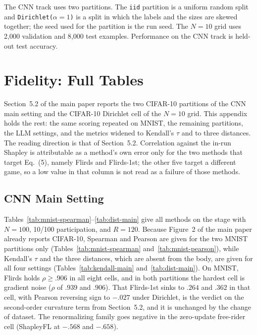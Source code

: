 \documentclass[letterpaper]{article} %
\theoremstyle{plain}
\begin{document}
The CNN track uses two partitions. The \texttt{iid} partition is a uniform
random split and \texttt{Dirichlet($\alpha{=}1$)} is a split in which the
labels and the sizes are skewed together; the seed used for the partition is
the run seed. The $N{=}10$ grid uses 2{,}000 validation and 8{,}000 test
examples. Performance on the CNN track is held-out test accuracy.

\section{Fidelity: Full Tables}
\label{app:fidelity}

Section~5.2 of the main paper reports the two CIFAR-10 partitions of the CNN
main setting and the CIFAR-10 Dirichlet cell of the $N{=}10$ grid. This
appendix holds the rest: the same scoring repeated on MNIST, the remaining
partitions, the LLM settings, and the metrics widened to Kendall's $\tau$ and
to three distances. The reading direction is that of Section~5.2. Correlation
against the in-run Shapley is attributable as a method's own error only for
the two methods that target Eq.~(5), namely Flirds and Flirds-1st; the other
five target a different game, so a low value in that column is not read as a
failure of those methods.

\subsection{CNN Main Setting}
\label{app:cnn-main}

Tables~\ref{tab:mnist-spearman}--\ref{tab:dist-main} give all methods on the
stage with $N{=}100$, 10/100 participation, and $R{=}120$. Because Figure~2
of the main paper already reports CIFAR-10, Spearman and Pearson are given
for the two MNIST partitions only (Tables~\ref{tab:mnist-spearman}
and~\ref{tab:mnist-pearson}), while Kendall's $\tau$ and the three distances,
which are absent from the body, are given for all four settings
(Tables~\ref{tab:kendall-main} and~\ref{tab:dist-main}). On MNIST, Flirds
holds $\rho \ge .906$ in all eight cells, and in both partitions the hardest
cell is gradient noise ($\rho$ of $.939$ and $.906$). That Flirds-1st sinks
to $.264$ and $.362$ in that cell, with Pearson reversing sign to $-.027$
under Dirichlet, is the verdict on the second-order curvature term from
Section~5.2, and it is unchanged by the change of dataset. The renormalizing
family goes negative in the zero-update free-rider cell (ShapleyFL at
$-.568$ and $-.658$).
\end{document}
